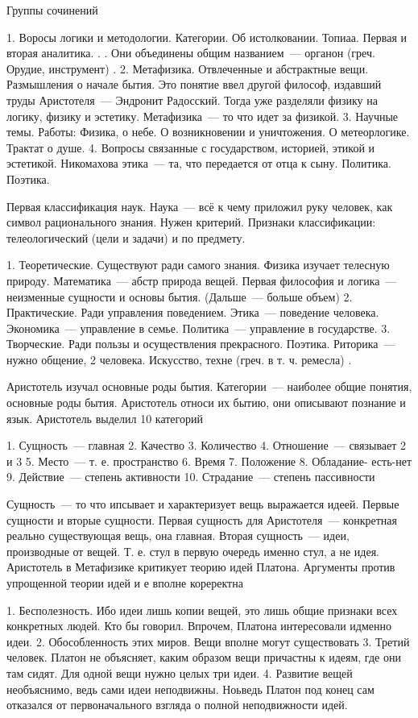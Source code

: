 
Группы сочинений

	1. Воросы логики и методологии. Категории. Об истолковании. Топиаа. Первая и вторая аналитика. . . Они объединены общим названием~--- органон (греч. Орудие, инструмент) . 
	2. Метафизика. Отвлеченные и абстрактные вещи. Размышления о начале бытия. Это понятие ввел другой философ, издавший труды Аристотеля~--- Эндронит Радосский. Тогда уже разделяли физику на логику, физику и эстетику. Метафизика~--- то что идет за физикой. 
	3. Научные темы. Работы: Физика, о небе. О возникновении и уничтожения. О метеорлогике. Трактат о душе. 
	4. Вопросы связанные с государством, историей, этикой и эстетикой. Никомахова этика~--- та, что передается от отца к сыну. Политика. Поэтика. 

Первая классификация наук. Наука~--- всё к чему приложил руку человек, как символ рационального знания. Нужен критерий. Признаки классификации: телеологический (цели и задачи) и по предмету. 

	1. Теоретические. Существуют ради самого знания. Физика изучает телесную природу. Математика~--- абстр природа вещей. Первая философия и логика~--- неизменные сущности и основы бытия. (Дальше~--- больше объем) 
	2. Практические. Ради управления поведением. Этика~--- поведение человека. Экономика~--- управление в семье. Политика~--- управление в государстве. 
	3. Творческие. Ради пользы и осуществления прекрасного. Поэтика. Риторика~--- нужно общение, 2 человека. Искусство, техне (греч. в т. ч. ремесла) . 

Аристотель изучал основные роды бытия. Категории~--- наиболее общие понятия, основные роды бытия. Аристотель относи их бытию, они описывают познание и язык. 
Аристотель выделил 10 категорий

	1. Сущность~--- главная
	2. Качество
	3. Количество
	4. Отношение~--- связывает 2 и 3
	5. Место~--- т. е. пространство
	6. Время
	7. Положение
	8. Обладание- есть-нет
	9. Действие~--- степень активности
	10. Страдание~--- степень пассивности

Сущность~--- то что ипсывает и характеризует вещь выражается идеей. Первые сущности и вторые сущности. Первая сущность для Аристотеля~--- конкретная реально существующая вещь, она главная. Вторая сущность~--- идеи, производные от вещей. Т. е. стул в первую очередь именно стул, а не идея. Аристотель в Метафизике критикует теорию идей Платона. Аргументы против упрощенной теории идей и е вполне кореректна

	1. Бесполезность. Ибо идеи лишь копии вещей, это лишь общие признаки всех конкретных людей. Кто бы говорил. Впрочем, Платона интересовали идменно идеи. 
	2. Обособленность этих миров. Вещи вполне могут существовать
	3. Третий человек. Платон не объясняет, каким образом вещи причастны к идеям, где они там сидят. Для одной вещи нужно целых три идеи. 
	4. Развитие вещей необъяснимо, ведь сами идеи неподвижны. Ноьведь Платон под конец сам отказался от первоначального взгляда о полной неподвижности идей. 

